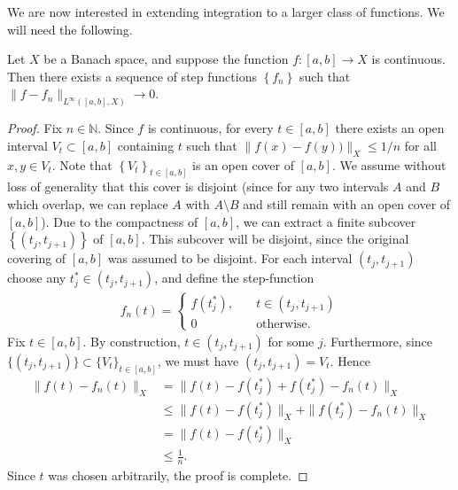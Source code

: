 %
We are now interested in extending integration to a larger class of functions. We will need the
following. %
%
\begin{lemma}
	\label{lem:dense}
	Let $X$ be a Banach space, and
	suppose the function $f:[a,b] \to X$ is continuous. Then
	there exists a sequence of step functions $\left\{ f_n \right\}$
	such that $\|f - f_n\|_{L^\infty( [a,b], X)} \to 0$. 
\end{lemma}
%
%
\begin{proof}
  Fix $n \in \mathbb{N}$. Since $f$ is continuous, for every $t \in
\left[ a,b \right]$ there exists an open interval $V_t \subset [a,b]$ containing
$t$ such that
$\|f(x) - f(y)) \|_X \le 1/n$ for all $x, y \in V_t$. Note that $\left\{ V_t
\right\}_{t \in \left[ a,b \right]}$ is an open cover of $[a,b]$. We assume
without loss of generality that this cover is disjoint (since for any two
intervals $A$ and $B$ which overlap, we can replace $A$ with $A \setminus
B$ and still remain with an open cover of $[a,b]$). 
Due to the compactness of $[a,b]$, we can extract
a finite subcover $\left\{ (t_j, t_{j +1}) \right\}$ of $[a,b]$. This subcover
will be disjoint, since the original covering of $[a,b]$ was assumed to be
disjoint. For each interval $(t_j, t_{j +1})$
choose any $t_{j}^* \in (t_{j}, t_{j +1})$, and define the step-function
%
%
\begin{equation*}
	\begin{split}
		f_n(t) =
		\begin{cases}
      f(t_{j}^{*}), \quad & t \in (t_{j},t_{j+1}) 
		\\
		0 & \text{otherwise}.
	\end{cases}
	\end{split}
\end{equation*}
%
Fix $t \in [a,b]$. By construction, $t \in (t_{j}, t_{j+1})$ for some $j$.
Furthermore, since $\{(t_{j}, t_{j+1}) \} \subset \{V_{t}\}_{t \in [a,b]}$, we must have $(t_{j}, t_{j+1}) = V_{t}$. Hence
%
\begin{equation*}
	\begin{split}
		\|f(t)-f_n(t)\|_X
    & = \| f(t) - f(t_{j}^{*}) + f(t_{j}^{*}) - f_{n}(t)  \|_{X}
    \\
    & \le \| f(t) - f(t_{j}^{*}) \|_{X} + \| f(t_{j}^{*}) - f_{n}(t) \|_{X}
    \\
    & = \| f(t) - f(t_{j}^{*}) \|_{X}
    \\
    & \le \frac{1}{n}.
	\end{split}
\end{equation*}
%
%
Since $t$ was chosen arbitrarily, the proof is complete. 
\end{proof}
